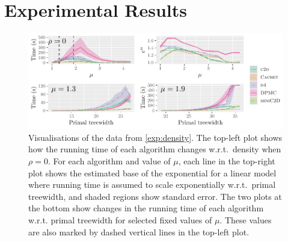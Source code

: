 \documentclass[letterpaper]{article} %
\theoremstyle{definition}
\theoremstyle{remark}
\begin{document}

\section{Experimental Results}\label{sec:experiments}

\begin{figure}
  \centering
  \includegraphics{treewidth}
  \caption{Visualisations of the data from \cref{exp:density}. The top-left plot
    shows how the running time of each algorithm changes w.r.t.\ density
    when $\rho = 0$. For each algorithm and value of $\mu$, each line in the
    top-right plot shows the estimated base of the exponential for a linear
    model where running time is assumed to scale exponentially w.r.t.\ primal
    treewidth, and shaded regions show standard error. The two plots at the
    bottom show changes in the running time of each algorithm w.r.t.
    primal treewidth for selected fixed values of $\mu$. These values are also
    marked by dashed vertical lines in the top-left plot.}\label{fig:treewidth}
\end{figure}
\end{document}
